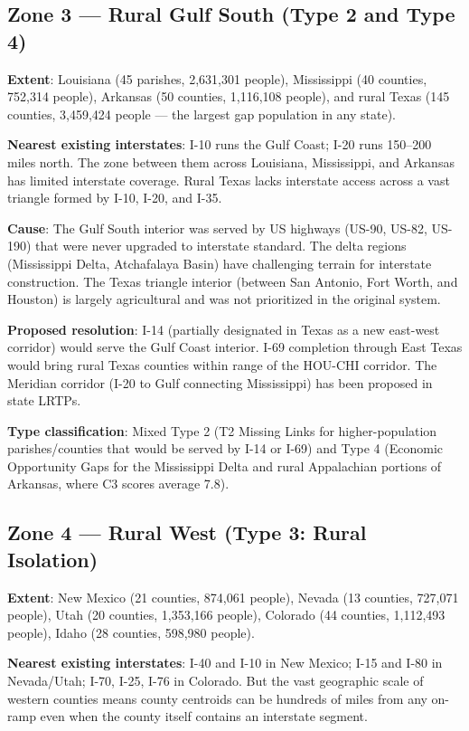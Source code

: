 \subsection{Zone 3 — Rural Gulf South (Type 2 and Type 4)}

\textbf{Extent}: Louisiana (45 parishes, 2,631,301 people), Mississippi (40 counties, 752,314 people), Arkansas (50 counties, 1,116,108 people), and rural Texas (145 counties, 3,459,424 people --- the largest gap population in any state).

\textbf{Nearest existing interstates}: I-10 runs the Gulf Coast; I-20 runs 150--200 miles north. The zone between them across Louisiana, Mississippi, and Arkansas has limited interstate coverage. Rural Texas lacks interstate access across a vast triangle formed by I-10, I-20, and I-35.

\textbf{Cause}: The Gulf South interior was served by US highways (US-90, US-82, US-190) that were never upgraded to interstate standard. The delta regions (Mississippi Delta, Atchafalaya Basin) have challenging terrain for interstate construction. The Texas triangle interior (between San Antonio, Fort Worth, and Houston) is largely agricultural and was not prioritized in the original system.

\textbf{Proposed resolution}: I-14 (partially designated in Texas as a new east-west corridor) would serve the Gulf Coast interior. I-69 completion through East Texas would bring rural Texas counties within range of the HOU-CHI corridor. The Meridian corridor (I-20 to Gulf connecting Mississippi) has been proposed in state LRTPs.

\textbf{Type classification}: Mixed Type 2 (T2 Missing Links for higher-population parishes/counties that would be served by I-14 or I-69) and Type 4 (Economic Opportunity Gaps for the Mississippi Delta and rural Appalachian portions of Arkansas, where C3 scores average 7.8).

\subsection{Zone 4 — Rural West (Type 3: Rural Isolation)}

\textbf{Extent}: New Mexico (21 counties, 874,061 people), Nevada (13 counties, 727,071 people), Utah (20 counties, 1,353,166 people), Colorado (44 counties, 1,112,493 people), Idaho (28 counties, 598,980 people).

\textbf{Nearest existing interstates}: I-40 and I-10 in New Mexico; I-15 and I-80 in Nevada/Utah; I-70, I-25, I-76 in Colorado. But the vast geographic scale of western counties means county centroids can be hundreds of miles from any on-ramp even when the county itself contains an interstate segment.

